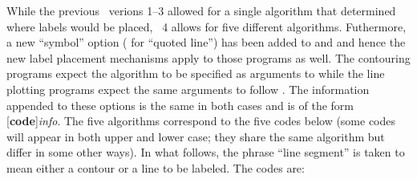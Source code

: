 While the previous \GMT\ verions 1--3 allowed for a single algorithm that
determined where labels would be placed, \GMT\ 4 allows for five different
algorithms.  Futhermore, a new ``symbol'' option ( for ``quoted line'')
has been added to  and  and hence the new label
placement mechanisms apply to those programs as well.  The contouring programs
expect the algorithm to be specified as arguments to  while the line plotting
programs expect the same arguments to follow .  The information appended
to these options is the same in both cases and is of the form [{\bf code}]{\it info}.
The five algorithms correspond to the five codes below (some codes will appear in both
upper and lower case; they share the same algorithm but differ in some other ways).
In what follows, the phrase ``line segment'' is taken to mean either a contour or a line
to be labeled.  The codes are:
